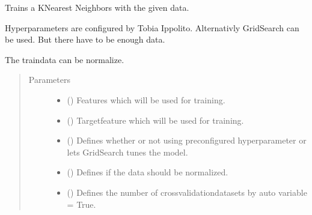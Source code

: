 \documentclass[letterpaper,10pt,english]{sphinxmanual}
\begin{document}
\begin{fulllineitems}
\label{\detokenize{anoog.model:anoog.model.model.train_knn}}
\sphinxAtStartPar
Trains a K\sphinxhyphen{}Nearest Neighbors with the given data.

\sphinxAtStartPar
Hyperparameters are configured by Tobia Ippolito. Alternativly GridSearch can be used. But there have to be enough data.

\sphinxAtStartPar
The traindata can be normalize.
\begin{quote}\begin{description}
\item[{Parameters}] \leavevmode\begin{itemize}
\item {} 
\sphinxAtStartPar
{} () \textendash{} Features which will be used for training.

\item {} 
\sphinxAtStartPar
{} () \textendash{} Target\sphinxhyphen{}feature which will be used for training.

\item {} 
\sphinxAtStartPar
{} (\sphinxstyleliteralemphasis{\sphinxupquote{, }}) \textendash{} Defines whether or not using preconfigured hyperparameter or lets GridSearch tunes the model.

\item {} 
\sphinxAtStartPar
{} (\sphinxstyleliteralemphasis{\sphinxupquote{, }}) \textendash{} Defines if the data should be normalized.

\item {} 
\sphinxAtStartPar
{} (\sphinxstyleliteralemphasis{\sphinxupquote{, }}) \textendash{} Defines the number of cross\sphinxhyphen{}validation\sphinxhyphen{}datasets by auto variable = True.


\end{itemize}
\end{description}
\end{quote}
\end{fulllineitems}
\end{document}
